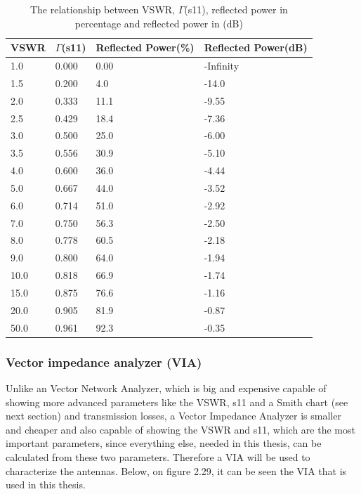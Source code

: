 \begin{table}[h!]
\centering
\begin{tabular}{|l|l|l|l|}
\hline
VSWR & $\Gamma$(s11) & Reflected Power(\%) & Reflected Power(dB) \\\hline
1.0  & 0.000          & 0.00  & -Infinity     \\ \hline
1.5  & 0.200          & 4.0   & -14.0         \\ \hline
2.0  & 0.333          & 11.1  & -9.55         \\ \hline
2.5  & 0.429          & 18.4  & -7.36         \\ \hline
3.0  & 0.500          & 25.0  & -6.00         \\ \hline
3.5  & 0.556          & 30.9  & -5.10         \\ \hline
4.0  & 0.600          & 36.0  & -4.44         \\ \hline
5.0  & 0.667          & 44.0  & -3.52         \\ \hline
6.0  & 0.714          & 51.0  & -2.92         \\ \hline
7.0  & 0.750          & 56.3  & -2.50         \\ \hline
8.0  & 0.778          & 60.5  & -2.18         \\ \hline
9.0  & 0.800          & 64.0  & -1.94         \\ \hline
10.0 & 0.818          & 66.9  & -1.74         \\ \hline
15.0 & 0.875          & 76.6  & -1.16         \\ \hline
20.0 & 0.905          & 81.9  & -0.87         \\ \hline
50.0 & 0.961          & 92.3  & -0.35         \\ \hline
\end{tabular}
\caption{The relationship between VSWR, $\Gamma$(s11), reflected power in percentage and reflected power in (dB)}
\end{table}
\subsubsection{Vector impedance analyzer (VIA)}
 Unlike an Vector Network Analyzer, which is big and expensive capable of showing more advanced parameters like the VSWR, s11 and a Smith chart (see next section) and transmission losses, a Vector Impedance Analyzer is smaller and cheaper and also capable of showing the VSWR and s11, which are the most important parameters, since everything else, needed in this thesis, can be calculated from these two parameters. Therefore a VIA will be used to characterize the antennas. Below, on figure 2.29, it can be seen the VIA that is used in this thesis.
 
